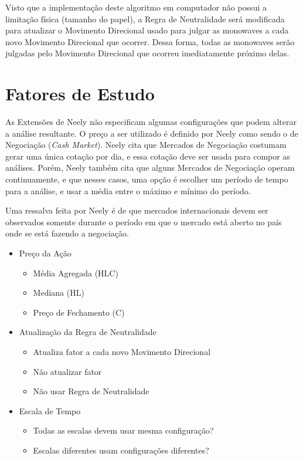 \documentclass[12pt]{article}
\begin{document}
Visto que a implementação deste algoritmo em computador não possui a limitação física (tamanho
do papel), a Regra de Neutralidade será modificada para atualizar o Movimento Direcional
usado para julgar as monowaves a cada novo Movimento Direcional que ocorrer. Dessa forma,
todas as monowaves serão julgadas pelo Movimento Direcional que ocorreu imediatamente
próximo delas.

\section{Fatores de Estudo}

As Extensões de Neely não especificam algumas configurações que podem alterar a
análise resultante. O preço a ser utilizado é definido por Neely como sendo o de Negociação
(\textit{Cash Market}). Neely cita que Mercados de Negociação costumam gerar uma única cotação
por dia, e essa cotação deve ser usada para compor as análises. Porém, Neely também cita
que alguns Mercados de Negociação operam continuamente, e que nesses casos, uma opção é
escolher um período de tempo para a análise, e usar a média entre o máximo e mínimo do período.

Uma ressalva feita por Neely é de que mercados internacionais devem ser observados somente
durante o período em que o mercado está aberto no país onde se está fazendo a negociação.

\begin{itemize}
	\item Preço da Ação
	\begin{itemize}
		\item Média Agregada (HLC)
		\item Mediana (HL)
		\item Preço de Fechamento (C)
	\end{itemize}
	\item Atualização da Regra de Neutralidade
	\begin{itemize}
		\item Atualiza fator a cada novo Movimento Direcional
		\item Não atualizar fator
		\item Não usar Regra de Neutralidade
	\end{itemize}
	\item Escala de Tempo
	\begin{itemize}
		\item Todas as escalas devem usar mesma configuração?
		\item Escalas diferentes usam configurações diferentes?
	\end{itemize}
\end{itemize}
\end{document}
